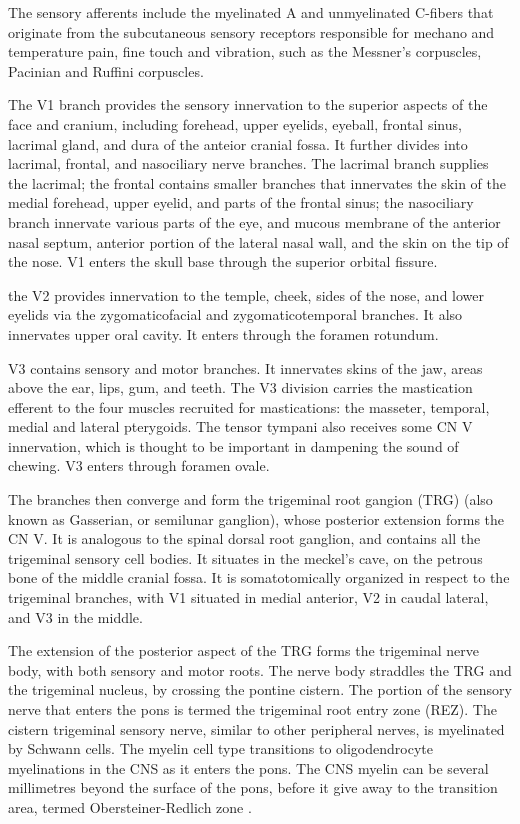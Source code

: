 The sensory afferents include the myelinated A and unmyelinated C-fibers that originate from the subcutaneous sensory receptors responsible for mechano and temperature pain, fine touch and vibration, such as the Messner's corpuscles, Pacinian and Ruffini corpuscles. 

The V1 branch provides the sensory innervation to the superior aspects of the face and cranium, including forehead, upper eyelids, eyeball, frontal sinus, lacrimal gland, and dura of the anteior cranial fossa. It further divides into lacrimal, frontal, and nasociliary nerve branches. The lacrimal branch supplies the lacrimal; the frontal contains smaller branches that innervates the skin of the medial forehead, upper eyelid, and parts of the frontal sinus; the nasociliary branch innervate various parts of the eye, and mucous membrane of the anterior nasal septum, anterior portion of the lateral nasal wall, and the skin on the tip of the nose. V1 enters the skull base through the superior orbital fissure.  

the V2 provides innervation to the temple, cheek, sides of the nose, and lower eyelids via the zygomaticofacial and zygomaticotemporal branches. It also innervates upper oral cavity. It enters through the foramen rotundum. 

V3 contains sensory and motor branches. It innervates skins of the jaw, areas above the ear, lips, gum, and teeth. The V3 division carries the mastication efferent to the four muscles recruited for mastications: the masseter, temporal, medial and lateral pterygoids. The tensor tympani also receives some CN V innervation, which is thought to be important in dampening the sound of chewing. V3 enters through foramen ovale. 

The branches then converge and form the trigeminal root gangion (TRG) (also known as Gasserian, or semilunar ganglion), whose posterior extension forms the CN V. It is analogous to the spinal dorsal root ganglion, and contains all the trigeminal sensory cell bodies. It situates in the meckel's cave, on the petrous bone of the middle cranial fossa. It is somatotomically organized in respect to the trigeminal branches, with V1 situated in medial anterior, V2 in caudal lateral, and V3 in the middle.

The extension of the posterior aspect of the TRG forms the trigeminal nerve body, with both sensory and motor roots. The nerve body straddles the TRG and the trigeminal nucleus, by crossing the pontine cistern. The portion of the sensory nerve that enters the pons is termed the trigeminal root entry zone (REZ). The cistern trigeminal sensory nerve, similar to other peripheral nerves, is myelinated by Schwann cells. The myelin cell type transitions to oligodendrocyte myelinations in the CNS as it enters the pons. The CNS myelin can be several millimetres beyond the surface of the pons, before it give away to the transition area, termed Obersteiner-Redlich zone \cite{Peker2006}.

